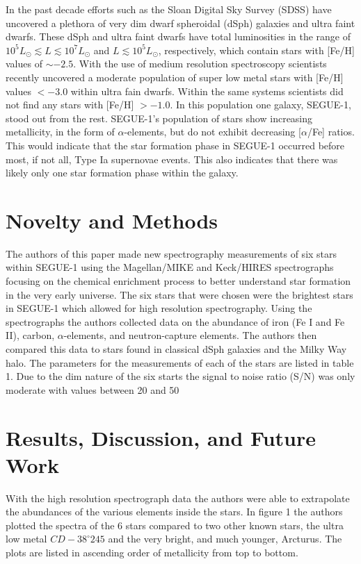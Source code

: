 \documentclass{aastex631}
\begin{document}
In the past decade efforts such as the Sloan Digital Sky Survey (SDSS) have uncovered a plethora of very dim dwarf spheroidal
(dSph) galaxies and ultra faint dwarfs. These dSph and ultra faint dwarfs have total luminosities in the range of
\(10^{5} L_{\odot} \lesssim L \lesssim 10^{7} L_{\odot}\) and \(L \lesssim 10^5 L_{\odot}\), respectively, which contain
stars with [Fe/H] values of $\sim -2.5$. With the use of medium resolution spectroscopy scientists recently uncovered a
moderate population of super low metal stars with [Fe/H] values $< -3.0$ within ultra fain dwarfs. Within the same systems
scientists did not find any stars with [Fe/H] $> -1.0$. In this population one galaxy, SEGUE-1, stood out from the rest. 
SEGUE-1's population of stars show increasing metallicity, in the form of $\alpha$-elements, but do not exhibit decreasing
[$\alpha$/Fe] ratios. 
This would indicate that the star formation phase in SEGUE-1 occurred before most, if not all, Type Ia supernovae events. This
also indicates that there was likely only one star formation phase within the galaxy.

\section{Novelty and Methods} \label{sec:novelty}

The authors of this paper made new spectrography measurements of six stars within SEGUE-1 using the Magellan/MIKE and Keck/HIRES
spectrographs focusing on the chemical enrichment process to better understand star formation in the very early universe. The six
stars that were chosen were the brightest stars in SEGUE-1 which allowed for high resolution spectrography. Using the spectrographs
the authors collected data on the abundance of iron (Fe I and Fe II), carbon, $\alpha$-elements, and neutron-capture elements.
The authors then compared this data to stars found in classical dSph galaxies and the Milky Way halo.
The parameters for the measurements of each of the stars are listed in table 1. Due to the dim nature of the six starts the signal to
noise ratio (S/N) was only moderate with values between 20 and 50

\section{Results, Discussion, and Future Work} \label{sec:dicussion}

With the high resolution spectrograph data the authors were able to extrapolate the abundances of the various elements inside the stars.
In figure 1 the authors plotted the spectra of the 6 stars compared to two other known stars, the ultra low metal $CD -38^{\circ}245$
and the very bright, and much younger, Arcturus. The plots are listed in ascending order of metallicity from top to bottom.
\end{document}
